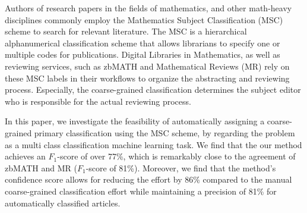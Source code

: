 Authors of research papers in the fields of mathematics, and other math-heavy disciplines commonly employ the Mathematics Subject
Classification (MSC) scheme to search for relevant literature.
The MSC is a hierarchical alphanumerical classification scheme that allows librarians to specify one or multiple codes for publications.
Digital Libraries in Mathematics, as well as reviewing services, such as zbMATH and Mathematical Reviews (MR) rely on these MSC labels in their workflows to organize the abstracting and reviewing process.
Especially, the coarse-grained classification determines the subject editor who is responsible for the actual reviewing process.

In this paper, we investigate the feasibility of automatically assigning a coarse-grained primary classification using the MSC
scheme, by regarding the problem as a multi class classification machine learning task.
We find that the our method achieves an \(F_{1}\)-score of over 77\%, which is remarkably close to the agreement of zbMATH and MR (\(F_{1}\)-score of 81\%).
Moreover, we find that the method's confidence score allows for reducing the effort by 86\% compared to the manual coarse-grained classification effort while maintaining a precision of 81\% for automatically classified articles.
